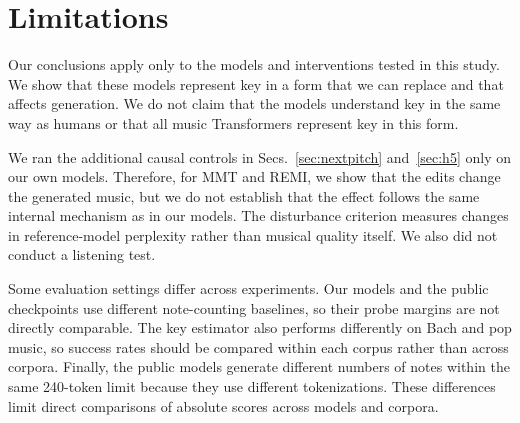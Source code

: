 \documentclass{article}
\begin{document}
\section{Limitations}
\label{sec:limits}
Our conclusions apply only to the models and interventions tested in this study.
We show that these models represent key in a form that we can replace and that affects generation.
We do not claim that the models understand key in the same way as humans or that all music Transformers represent key in this form.

We ran the additional causal controls in Secs.~\ref{sec:nextpitch} and~\ref{sec:h5} only on our own models.
Therefore, for MMT and REMI, we show that the edits change the generated music, but we do not establish that the effect follows the same internal mechanism as in our models.
The disturbance criterion measures changes in reference-model perplexity rather than musical quality itself.
We also did not conduct a listening test.

Some evaluation settings differ across experiments.
Our models and the public checkpoints use different note-counting baselines, so their probe margins are not directly comparable.
The key estimator also performs differently on Bach and pop music, so success rates should be compared within each corpus rather than across corpora.
Finally, the public models generate different numbers of notes within the same 240-token limit because they use different tokenizations.
These differences limit direct comparisons of absolute scores across models and corpora.
\end{document}

